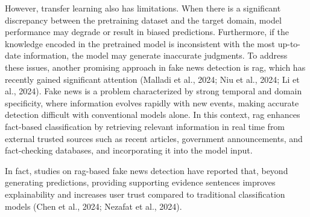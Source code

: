 \documentclass[a4paper,fleqn]{cas-sc}
\begin{document}
However, transfer learning also has limitations. When there is a significant discrepancy between the pretraining dataset and the target domain, model performance may degrade or result in biased predictions. Furthermore, if the knowledge encoded in the pretrained model is inconsistent with the most up-to-date information, the model may generate inaccurate judgments.
To address these issues, another promising approach in fake news detection is \gls{rag}, which has recently gained significant attention (Malladi et al., 2024; Niu et al., 2024; Li et al., 2024). Fake news is a problem characterized by strong temporal and domain specificity, where information evolves rapidly with new events, making accurate detection difficult with conventional models alone. In this context, \gls{rag} enhances fact-based classification by retrieving relevant information in real time from external trusted sources such as recent articles, government announcements, and fact-checking databases, and incorporating it into the model input.

In fact, studies on \gls{rag}-based fake news detection have reported that, beyond generating predictions, providing supporting evidence sentences improves explainability and increases user trust compared to traditional classification models (Chen et al., 2024; Nezafat et al., 2024).
\end{document}
